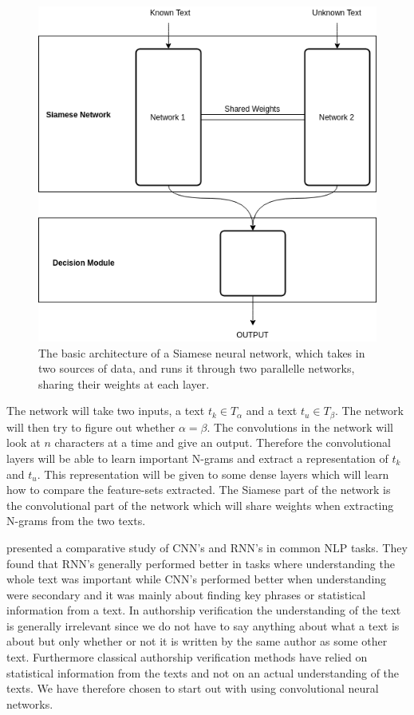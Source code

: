 \begin{figure}
    \centering
    \includegraphics[scale=0.5]{./pictures/method/Siamese.png}
    \caption{The basic architecture of a Siamese neural network, which takes in
        two sources of data, and runs it through two parallelle networks,
        sharing their weights at each layer.}
    \label{fig:siamese_example}
\end{figure}

The network will take two inputs, a text $t_k \in T_\alpha$ and a text $t_u
\in T_\beta$. The network will then try to figure out whether $\alpha =
\beta$. The convolutions in the network will look at $n$ characters at a
time and give an output. Therefore the convolutional layers will be able to
learn important N-grams and extract a representation of $t_k$ and $t_u$. This
representation will be given to some dense layers which will learn how to
compare the feature-sets extracted. The Siamese part of the network is the
convolutional part of the network which will share weights when extracting
N-grams from the two texts.

\citet{DBLP:journals/corr/0001KYS17} presented a comparative study of
\gls{CNN}'s and \gls{RNN}'s in common \gls{NLP} tasks. They found that
\gls{RNN}'s generally performed better in tasks where understanding the whole
text was important while \gls{CNN}'s performed better when understanding were
secondary and it was mainly about finding key phrases or statistical information
from a text. In authorship verification the understanding of the text is
generally irrelevant since we do not have to say anything about what a text is
about but only whether or not it is written by the same author as some other
text. Furthermore classical authorship verification methods have relied on
statistical information from the texts and not on an actual understanding of the
texts. We have therefore chosen to start out with using convolutional neural
networks.

